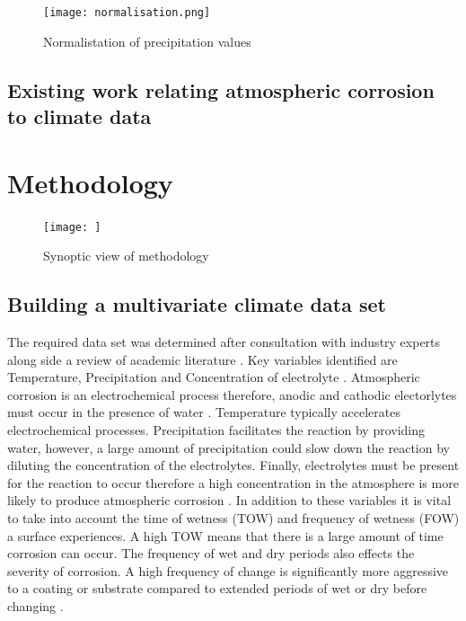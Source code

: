 \documentclass{article}
\begin{document}
\begin{figure}[h]
    \centering
    \texttt{[image: normalisation.png]}
    \caption{Normalistation of precipitation values}
    \label{fig:prec_norm}
\end{figure}



\subsection{Existing work relating atmospheric corrosion to climate data}

\section{Methodology}\label{Methodolgy}

\begin{figure}[h]
    \centering
    \texttt{[image: ]}
    \caption{Synoptic view of methodology}
    \label{fig:my_label}
\end{figure}

\subsection{Building a multivariate climate data set} \label{Building a multivariate climate data set}
The required data set was determined after consultation with industry experts along side a review of academic literature \citep{Daly2006}. Key variables identified are Temperature, Precipitation and Concentration of electrolyte \citep{LeBozec2018}. Atmospheric corrosion is an electrochemical process therefore, anodic and cathodic electorlytes must occur in the presence of water \citep{DelaFuente2011}. Temperature typically accelerates electrochemical processes. Precipitation facilitates the reaction by providing water, however, a large amount of precipitation could slow down the reaction by diluting the concentration of the electrolytes. Finally, electrolytes must be present for the reaction to occur therefore a high concentration in the atmosphere is more likely to produce atmospheric corrosion \citep{LeBozec2018}. In addition to these variables it is vital to take into account the time of wetness (TOW) and frequency of wetness (FOW) a surface experiences. A high TOW means that there is a large amount of time corrosion can occur. The frequency of wet and dry periods also effects the severity of corrosion. A high frequency of change is significantly more aggressive to a coating or substrate compared to extended periods of wet or dry before changing \citep{LeBozec2018}.
\end{document}
